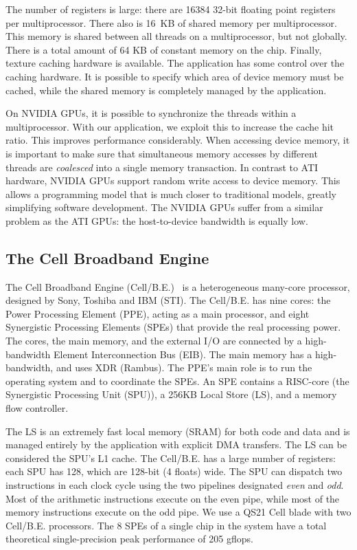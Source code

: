 \documentclass{article}
\begin{document}
The number of registers is large: there are 16384 32-bit floating
point registers per multiprocessor. There also is 16~KB of shared
memory per multiprocessor.  This memory is shared between all threads
on a multiprocessor, but not globally.  There is a total amount of 64
KB of constant memory on the chip.  Finally, texture caching hardware
is available.  The application has some control over the caching
hardware.  It is possible to specify which area of device memory must
be cached, while the shared memory is completely managed by the
application.

On NVIDIA GPUs, it is possible to synchronize the threads within a
multiprocessor.  With our application, we exploit this to increase the
cache hit ratio. This improves performance considerably.  When
accessing device memory, it is important to make sure that
simultaneous memory accesses by different threads are \emph{coalesced}
into a single memory transaction.  In contrast to ATI hardware, NVIDIA
GPUs support random write access to device memory. This allows a
programming model that is much closer to traditional models, greatly
simplifying software development.  The NVIDIA GPUs suffer from a
similar problem as the ATI GPUs: the host-to-device bandwidth is
equally low.



\subsection{The Cell Broadband Engine}

The Cell Broadband Engine (\mbox{Cell/B.E.})~\cite{cell} is a
heterogeneous many-core processor, designed by Sony, Toshiba and IBM
(STI).  The \mbox{Cell/B.E.} has nine cores: the Power Processing
Element (PPE), acting as a main processor, and eight Synergistic
Processing Elements (SPEs) that provide the real processing power.
The cores, the main memory, and the external I/O are connected by a
high-bandwidth Element Interconnection Bus (EIB).  The main memory has
a high-bandwidth, and uses XDR (Rambus).  The PPE's main role is to
run the operating system and to coordinate the SPEs.  An SPE contains
a RISC-core (the Synergistic Processing Unit (SPU)), a 256KB Local
Store (LS), and a memory flow controller.

The LS is an extremely fast local memory (SRAM) for both code and data
and is managed entirely by the application with explicit DMA
transfers.  The LS can be considered the SPU's L1 cache.  The
\mbox{Cell/B.E.} has a large number of registers: each SPU has 128,
which are 128-bit (4 floats) wide.  The SPU can dispatch two
instructions in each clock cycle using the two pipelines designated
\emph{even} and \emph{odd}. Most of the arithmetic instructions
execute on the even pipe, while most of the memory instructions
execute on the odd pipe.  We use a QS21 Cell blade with two
\mbox{Cell/B.E.} processors.  The 8 SPEs of a single chip in the
system have a total theoretical single-precision peak performance of
205 gflops.
\end{document}
